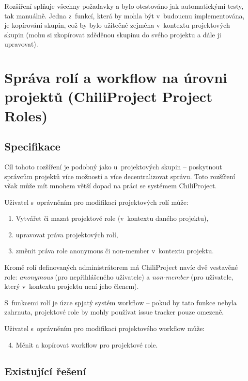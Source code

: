 \documentclass[thesis=B,czech]{FITthesis}[2012/05/02]
\begin{document}
Rozšíření splňuje všechny požadavky a bylo otestováno jak automatickými
testy, tak manuálně. Jedna z~funkcí, která by mohla být v~budoucnu
implementována, je kopírování skupin, což by bylo užitečné zejména
v~kontextu projektových skupin (mohu si zkopírovat zděděnou skupinu do
svého projektu a dále ji upravovat).

\section[Správa rolí a workflow na úrovni projektů]{Správa rolí a workflow na úrovni projektů (ChiliProject Project
Roles)}
\label{sec:project_roles}

\subsection{Specifikace}

Cíl tohoto rozšíření je podobný jako u~projektových skupin -- poskytnout
správcům projektů více možností a více decentralizovat správu. Toto
rozšíření však může mít mnohem větší dopad na práci se systémem
ChiliProject.

Uživatel s~oprávněním pro modifikaci projektových rolí může:

\begin{enumerate}[1.]
\item
  Vytvářet či mazat projektové role (v~kontextu daného projektu),
\item
  upravovat práva projektových rolí,
\item
  změnit práva role anonymous či non-member v~kontextu projektu.
\end{enumerate}
Kromě rolí definovaných administrátorem má ChiliProject navíc dvě
vestavěné role: \emph{anonymous} (pro nepřihlášeného uživatele) a
\emph{non-member} (pro uživatele, který v~kontextu projektu není jeho
členem).

S~funkcemi rolí je úzce spjatý systém \gls{workflow} -- pokud by tato
funkce nebyla zahrnuta, projektové role by mohly používat
issue tracker pouze omezeně.

Uživatel s~oprávněním pro modifikaci projektového \gls{workflow} může:

\begin{enumerate}[1.]
\setcounter{enumi}{3}
\item
  Měnit a kopírovat workflow pro projektové role.
\end{enumerate}
\subsection{Existující řešení}
\end{document}
